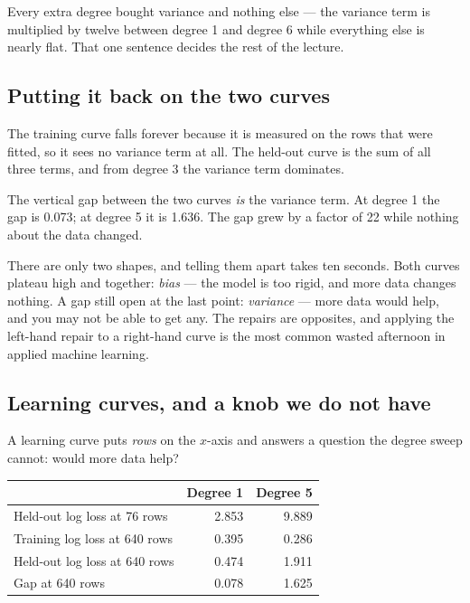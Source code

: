 \documentclass[11pt,a4paper]{article}
\begin{document}
\begin{keybox}[title={There was never much bias to buy back}]
Every extra degree bought variance and nothing else --- the variance term is
multiplied by twelve between degree 1 and degree 6 while everything else is
nearly flat. That one sentence decides the rest of the lecture.
\end{keybox}

\subsection{Putting it back on the two curves}

The training curve falls forever because it is measured on the rows that were
fitted, so it sees no variance term at all. The held-out curve is the sum of
all three terms, and from degree 3 the variance term dominates.

\begin{keybox}[title={The identification, stated once}]
The vertical gap between the two curves \emph{is} the variance term. At degree
1 the gap is 0.073; at degree 5 it is 1.636. The gap grew by a factor of 22
while nothing about the data changed.
\end{keybox}

There are only two shapes, and telling them apart takes ten seconds. Both
curves plateau high and together: \emph{bias} --- the model is too rigid, and
more data changes nothing. A gap still open at the last point: \emph{variance}
--- more data would help, and you may not be able to get any. The repairs are
opposites, and applying the left-hand repair to a right-hand curve is the most
common wasted afternoon in applied machine learning.

\subsection{Learning curves, and a knob we do not have}

A learning curve puts \emph{rows} on the $x$-axis and answers a question the
degree sweep cannot: would more data help?

\begin{center}
\small
\begin{tabular}{lrr}
\toprule
& \textbf{Degree 1} & \textbf{Degree 5} \\
\midrule
Held-out log loss at 76 rows  & 2.853 & 9.889 \\
Training log loss at 640 rows & 0.395 & 0.286 \\
Held-out log loss at 640 rows & 0.474 & 1.911 \\
Gap at 640 rows               & 0.078 & 1.625 \\
\bottomrule
\end{tabular}
\end{center}
\end{document}
